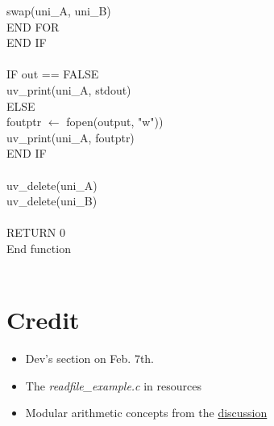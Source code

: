 \documentclass[12pt]{article}
\begin{document}
\indent \indent \indent swap(uni\_A, uni\_B) \\
\indent \indent END FOR \\
\indent END IF \\
\\
\indent IF out == FALSE \\
\indent \indent uv\_print(uni\_A, stdout) \\
\indent ELSE \\
\indent \indent foutptr $\leftarrow$ fopen(output, "w")) \\
\indent \indent uv\_print(uni\_A, foutptr) \\
\indent END IF \\
\\
\indent uv\_delete(uni\indent\_A) \\
\indent uv\_delete(uni\indent\_B) \\
\\
\indent RETURN 0 \\
End function \\
\\
\section{Credit}

\begin{itemize}
  \item Dev's section on Feb. 7th.
  \item The \textit{readfile\_example.c} in resources
  \item Modular arithmetic concepts from the \href{https://stackoverflow.com/questions/11720656/modulo-operation-with-negative-numbers}{discussion}
\end{itemize}
\end{document}
